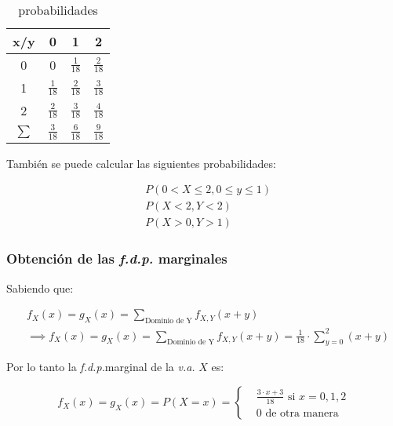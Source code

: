 \begin{table}[h!]
    \centering
    \begin{tabular}{cccc}
        \hline
        x/y    & 0              & 1              & 2              \\ \hline
        0      & 0              & $\frac{1}{18}$ & $\frac{2}{18}$ \\
        1      & $\frac{1}{18}$ & $\frac{2}{18}$ & $\frac{3}{18}$ \\
        2      & $\frac{2}{18}$ & $\frac{3}{18}$ & $\frac{4}{18}$ \\
        $\sum$ & $\frac{3}{18}$ & $\frac{6}{18}$ & $\frac{9}{18}$ \\ \hline
    \end{tabular}
    \caption{probabilidades}
    \label{tabme4}
\end{table}

También se puede calcular las
siguientes probabilidades:

\begin{align*}
     & P\left( 0<X\leq 2,0\leq y\leq 1\right) \\
     & P\left( X<2,Y<2\right)                 \\
     & P\left( X>0,Y>1\right)
\end{align*}

\subsubsection{Obtención de las \textit{f.d.p.} marginales}

Sabiendo que:

\begin{align*}
    &f_X\left( x \right) =g_X \left(  x\right) = \sum_{\text{Dominio de Y}}f_{X ,Y} \left(x+y\right) \\
    &\implies f_X\left( x \right) =g_X \left(  x\right) = \sum_{\text{Dominio de Y}}f_{X ,Y} \left(x+y\right) =\frac{1}{18}\cdot \sum_{y=0}^{2}\left(x+y\right)
\end{align*}

Por lo tanto la \textit{f.d.p.}marginal de la \textit{v.a.} $X$ es:

\begin{equation*}
    f_X\left(  x\right) =g_X\left( x\right) =P\left(X=x\right) =\begin{cases}
         & \frac{3\cdot x+3}{18}\text{ si }x=0,1,2 \\&0\text{ de otra manera}
    \end{cases}
\end{equation*}

